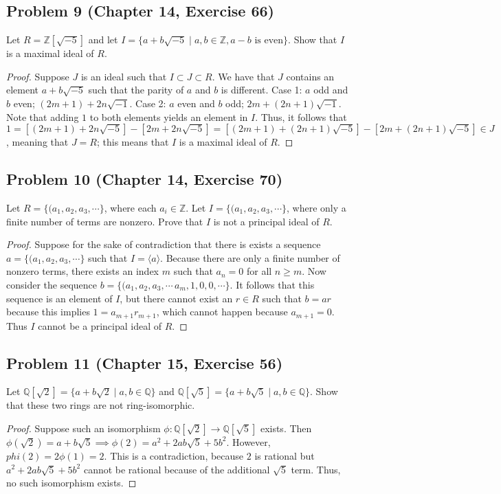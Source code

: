 \documentclass{article}
\begin{document}
\subsection*{Problem 9 (Chapter 14, Exercise 66)}
Let $R = \mathbb{Z}[\sqrt{-5}]$ and let $I = \{ a + b\sqrt{-5} \mid a, b \in \mathbb{Z}, a - b \text{ is even}\}$. Show that $I$ is a maximal ideal of $R$.
\begin{proof} 
Suppose $J$ is an ideal such that $I \subset J \subset R$. We have that $J$ contains an element $a + b\sqrt{-5}$ such that the parity of $a$ and $b$ is different. Case 1: $a$ odd and $b$ even; $(2m + 1) + 2n\sqrt{-1}$. Case 2: $a$ even and $b$ odd; $2m + (2n + 1)\sqrt{-1}$. Note that adding $1$ to both elements yields an element in $I$. Thus, it follows that $1 = [(2m + 1) + 2n\sqrt{-5}] - [2m + 2n\sqrt{-5}] = [(2m + 1) + (2n+1)\sqrt{-5}] - [2m + (2n+1)\sqrt{-5}] \in J$, meaning that $J = R$; this means that $I$ is a maximal ideal of $R$.  
\end{proof}

\subsection*{Problem 10 (Chapter 14, Exercise 70)}
Let $R = \{ (a_1, a_2, a_3, \cdots\}$, where each $a_i \in \mathbb{Z}$. Let $I = \{ (a_1, a_2, a_3, \cdots\}$, where only a finite number of terms are nonzero. Prove that $I$ is not a principal ideal of $R$.
\begin{proof}
Suppose for the sake of contradiction that there is exists a sequence $a = \{ (a_1, a_2, a_3, \cdots\}$ such that $I = \langle a \rangle$. Because there are only a finite number of nonzero terms, there exists an index $m$ such that $a_n = 0$ for all $n \geq m$. Now consider the sequence $b = \{ (a_1, a_2, a_3, \cdots\, a_m, 1, 0, 0, \cdots\}$. It follows that this sequence is an element of $I$, but there cannot exist an $r \in R$ such that $b = ar$ because this implies $1 = a_{m+1}r_{m+1}$, which cannot happen because $a_{m+1} = 0$. Thus $I$ cannot be a principal ideal of $R$.
\end{proof}

\subsection*{Problem 11 (Chapter 15, Exercise 56)}
Let $\mathbb{Q}[\sqrt{2}] = \{ a + b\sqrt{2} \mid a, b \in \mathbb{Q}\}$ and $\mathbb{Q}[\sqrt{5}] = \{ a + b\sqrt{5} \mid a, b \in \mathbb{Q}\}$. Show that these two rings are not ring-isomorphic.
\begin{proof}
Suppose such an isomorphism $\phi \colon \mathbb{Q}[\sqrt{2}] \to \mathbb{Q}[\sqrt{5}]$ exists. Then $\phi(\sqrt{2}) = a + b\sqrt{5} \implies \phi(2) = a^2 + 2ab\sqrt{5} + 5b^2$. However, $phi(2) = 2\phi(1) = 2$. This is a contradiction, because $2$ is rational but $a^2 + 2ab\sqrt{5} + 5b^2$ cannot be rational because of the additional $\sqrt{5}$ term. Thus, no such isomorphism exists.
\end{proof}
\end{document}
